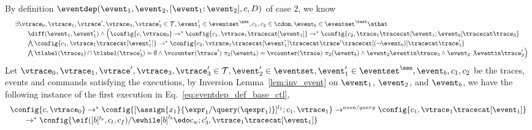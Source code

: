 \begin{subproof}
%
\label{pf:eventdep_base_ctl}
By definition $\eventdep(\event_1, \event_2, [\event_1; \event_2], c, D)$ of case 2, we know
\begin{equation}
  \label{eq:eventdep_def_base_ctl}
  \begin{array}{ll}   
    & \exists \vtrace_0,
    \vtrace_1, \vtrace', \vtrace_3, \vtrace_3' \in \mathcal{T},\event_1' \in \eventset^{\asn}, {c}_1, {c}_2  \in \cdom, 
    \event_b \in \eventset^{\test}
    \sthat 
    \\ 
   &   \qquad    \diff(\event_1, \event_1') 
\land
   \Big(
  \config{{c}, \vtrace_0} \rightarrow^{*} 
      \config{{c}_1, \vtrace_1 \tracecat [\event_1]}  \rightarrow^{*} 
      \config{c_2,  \trace_1 \tracecat [\event_1;\event_b] \tracecat  \trace_3} 
    \\   
   & \qquad \bigwedge 
    \config{{c}_1, \vtrace_1 \tracecat [\event_1']}  \rightarrow^{*} 
    \config{c_2,  \vtrace_1 \tracecat [\event_1'] \tracecat \trace' \tracecat [(\neg \event_b)] \tracecat \trace_3'} 
    \\
    & \qquad \bigwedge  \tlabel({\trace_3}) \cap \tlabel({\trace_3'}) = \emptyset
     \land \vcounter(\trace') ~  \pi_2(\event_b) = \vcounter(\trace) ~  \pi_2(\event_b)
      \land \event_2 \eventin \trace_3
    \land \event_2 \not\eventin \trace_3'
   \Big)
 \end{array}
  \end{equation}
%
Let $\vtrace_0,
\vtrace_1, \vtrace', \vtrace_3, \vtrace_3' \in \mathcal{T}, 
\event_2' \in \eventset, \event_1' \in \eventset^{\asn}, \event_b, {c}_1, {c}_2$ be the traces, events and commands satisfying the executions,
by Inversion Lemma~\ref{lem:inv_event} on 
$\event_1$, $\event_2$, and $\event_b$,
we have the following instance of the first execution in Eq.~\ref{eq:eventdep_def_base_ctl},
%
\begin{equation}
\label{eq:ctldep_inv1}
  \begin{array}{l}   
\config{{c}, \vtrace_0} \rightarrow^{*} 
\config{[\assign{{x}_1}{\expr_1 / \query(\qexpr_1)}]^{l_1} ; {c}_1, \vtrace_1}  
\rightarrow^{assn/query}
 \config{c_1, \vtrace_1 \tracecat [\event_1]} 
 \\
  \qquad \rightarrow^{*} 
  \config{\eif ([b]^{l_b}, c_t, c_f) / \ewhile [b]^{l_b} \edo c_w;{c}_3', 
  \vtrace_1 \tracecat [\event_1]} 
  \\
  \qquad 

\end{array}
\end{equation}
\end{subproof}
